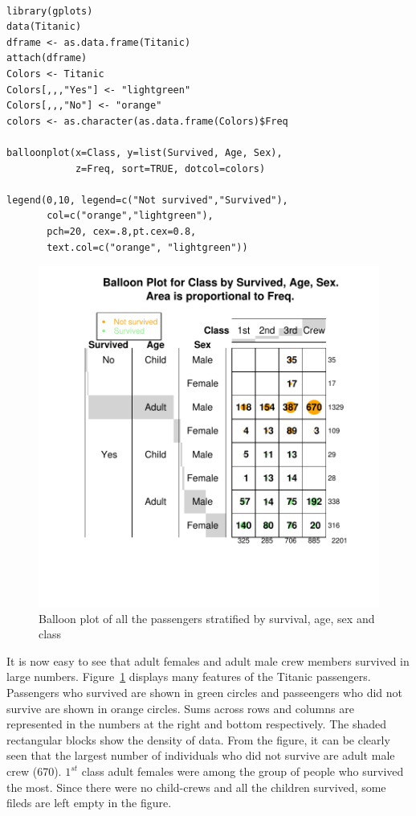 \documentclass[a4paper]{report}
\begin{document}
\begin{article}
{\small
\begin{verbatim}

library(gplots)
data(Titanic)
dframe <- as.data.frame(Titanic) 
attach(dframe)
Colors <- Titanic
Colors[,,,"Yes"] <- "lightgreen"
Colors[,,,"No"] <- "orange"
colors <- as.character(as.data.frame(Colors)$Freq

balloonplot(x=Class, y=list(Survived, Age, Sex), 
            z=Freq, sort=TRUE, dotcol=colors)

legend(0,10, legend=c("Not survived","Survived"),
       col=c("orange","lightgreen"),
       pch=20, cex=.8,pt.cex=0.8,
       text.col=c("orange", "lightgreen"))
\end{verbatim}
 }

\begin{figure}
\includegraphics[width=\textwidth]{Figure1.pdf}
\caption{\label{figure:Figure1}
Balloon plot of all the passengers stratified by survival, age, sex
and class}
\end{figure}

It is now easy to see that adult females and adult male crew members
survived in large numbers. Figure~\ref{figure:Figure1} displays many
features of the Titanic passengers. Passengers who survived are
shown in green circles and passeengers who did not survive are shown
in orange circles. Sums across rows and columns are represented in
the numbers at the right and bottom respectively.  The shaded
rectangular blocks show the density of data.  From the figure, it
can be clearly seen that the largest number of individuals who did
not survive are adult male crew (670). $1^{st}$ class adult females
were among the group of people who survived the most. Since there
were no child-crews and all the children survived, some fileds are
left empty in the figure. 






\end{article}
\end{document}

